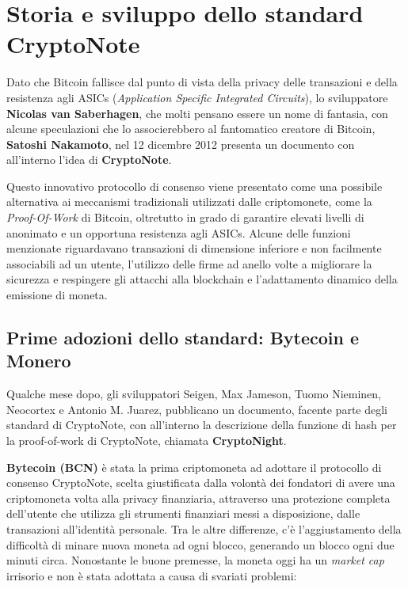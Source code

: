 \section{Storia e sviluppo dello standard CryptoNote}\label{inizio-dello-sviluppo-e-storia-dellalgoritmo}
Dato che Bitcoin fallisce dal punto di vista della privacy delle
transazioni e della resistenza agli ASICs (\emph{Application Specific
Integrated Circuits}), lo sviluppatore \textbf{Nicolas van Saberhagen},
che molti pensano essere un nome di fantasia, con alcune speculazioni
che lo associerebbero al fantomatico creatore di Bitcoin,
\textbf{Satoshi Nakamoto}, nel 12 dicembre 2012 presenta un documento
con all'interno l'idea di \textbf{CryptoNote}.

Questo innovativo protocollo di consenso viene presentato come una
possibile alternativa ai meccanismi tradizionali utilizzati dalle
criptomonete, come la \emph{Proof-Of-Work} di Bitcoin, oltretutto in grado di garantire
elevati livelli di anonimato e un opportuna resistenza agli ASICs.
Alcune delle funzioni menzionate riguardavano transazioni di dimensione
inferiore e non facilmente associabili ad un utente, l'utilizzo delle
firme ad anello volte a migliorare la sicurezza e respingere gli
attacchi alla blockchain e l'adattamento dinamico della emissione di
moneta.

\subsection{Prime adozioni dello standard: Bytecoin e Monero}\label{sviluppo-dello-standard-cryptonight-e-adozione}
Qualche mese dopo, gli sviluppatori Seigen, Max Jameson, Tuomo Nieminen,
Neocortex e Antonio M. Juarez, pubblicano un documento, facente parte
degli standard di CryptoNote, con all'interno la descrizione della
funzione di hash per la proof-of-work di CryptoNote, chiamata
\textbf{CryptoNight}.

\textbf{Bytecoin (BCN)} è stata la prima criptomoneta ad adottare il
protocollo di consenso CryptoNote, scelta giustificata dalla volontà dei
fondatori di avere una criptomoneta volta alla privacy finanziaria,
attraverso una protezione completa dell'utente che utilizza gli
strumenti finanziari messi a disposizione, dalle transazioni
all'identità personale. Tra le altre differenze, c'è l'aggiustamento
della difficoltà di minare nuova moneta ad ogni blocco, generando un
blocco ogni due minuti circa. Nonostante le buone premesse, la moneta
oggi ha un \emph{market cap} irrisorio e non è stata adottata a causa di
svariati problemi:

